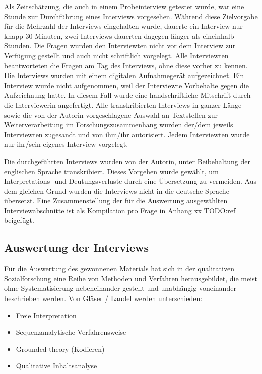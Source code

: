 Als Zeitschätzung, die auch in einem Probeinterview getestet wurde, war eine Stunde zur Durchführung eines Interviews vorgesehen. Während diese Zielvorgabe für die Mehrzahl der Interviews eingehalten wurde, dauerte ein Interview nur knapp 30 Minuten, zwei Interviews dauerten dagegen länger als eineinhalb Stunden. Die Fragen wurden den Interviewten nicht vor dem Interview zur Verfügung gestellt und auch nicht schriftlich vorgelegt. Alle Interviewten beantworteten die Fragen am Tag des Interviews, ohne diese vorher zu kennen. Die Interviews wurden mit einem digitalen Aufnahmegerät aufgezeichnet. Ein Interview wurde nicht aufgenommen, weil der Interviewte Vorbehalte gegen die Aufzeichnung hatte. In diesem Fall wurde eine handschriftliche Mitschrift durch die Interviewerin angefertigt. Alle transkribierten Interviews in ganzer Länge sowie die von der Autorin vorgeschlagene Auswahl an Textstellen zur Weiterverarbeitung im Forschungszusammenhang wurden der/dem jeweils Interviewten zugesandt und von ihm/ihr autorisiert. Jedem Interviewten wurde nur ihr/sein eigenes Interview vorgelegt.\par
Die durchgeführten Interviews wurden von der Autorin, unter Beibehaltung der englischen Sprache transkribiert. Dieses Vorgehen wurde gewählt, um Interpretations- und Deutungsverluste durch eine Übersetzung zu vermeiden. Aus dem gleichen Grund wurden die Interviews nicht in die deutsche Sprache übersetzt. Eine Zusammenstellung der für die Auswertung ausgewählten Interviewabschnitte ist als Kompilation pro Frage in Anhang xx TODO:ref beigefügt.

\subsection{Auswertung der Interviews}
Für die Auswertung des gewonnenen Materials hat sich in der qualitativen Sozialforschung eine Reihe von Methoden und Verfahren herausgebildet, die meist ohne Systematisierung nebeneinander gestellt und unabhängig voneinander beschrieben werden. Von Gläser / Laudel werden unterschieden:
\begin{itemize}
\item Freie Interpretation
\item Sequenzanalytische Verfahrensweise
\item Grounded theory (Kodieren)
\item Qualitative Inhaltsanalyse
\end{itemize}

